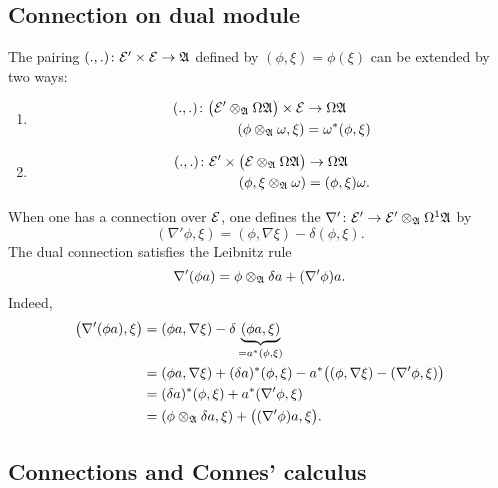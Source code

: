\subsection{Connection on dual module}

The pairing $(.,.)\colon \mathcal{E}'\times\mathcal{E}\to \mathfrak{A}$ defined by $(\phi,\xi)=\phi(\xi)$ can be extended by two ways:
\begin{enumerate}
\item 
 \begin{equation}
\begin{aligned}
 (.,.)\colon \big( \mathcal{E}'\otimes_{\mathfrak{A}}\Omega\mathfrak{A} \big)\times\mathcal{E}&\to \Omega\mathfrak{A} \\ 
   (\phi\otimes_{\mathfrak{A}}\omega,\xi)&=\omega^*(\phi,\xi)
\end{aligned}
\end{equation}
\item
\begin{equation}
\begin{aligned}
 (.,.)\colon \mathcal{E}'\times\big( \mathcal{E}\otimes_{\mathfrak{A}}\Omega\mathfrak{A} \big)&\to \Omega\mathfrak{A} \\ 
   (\phi,\xi\otimes_{\mathfrak{A}}\omega)&=(\phi,\xi)\omega. 
\end{aligned}
\end{equation}
\end{enumerate}
When one has a connection over $\mathcal{E}$, one defines the  $\nabla'\colon \mathcal{E}'\to \mathcal{E}'\otimes_{\mathfrak{A}}\Omega^1\mathfrak{A}$ by
\begin{equation}
(\nabla'\phi,\xi)=(\phi,\nabla\xi)-\delta(\phi,\xi).
\end{equation}
The dual connection satisfies the Leibnitz rule
\begin{equation}
\nabla'(\phi a)=\phi\otimes_{\mathfrak{A}}\delta a+(\nabla'\phi)a.
\end{equation}
Indeed,
\begin{align*}
\big( \nabla'(\phi a),\xi \big)&=(\phi a,\nabla\xi)-\delta\underbrace{(\phi a,\xi)}_{=a^*(\phi,\xi)}\\
				&=(\phi a,\nabla\xi)+(\delta a)^*(\phi,\xi)-a^*\big( (\phi,\nabla\xi)-(\nabla'\phi,\xi) \big)\\
				&=(\delta a)^*(\phi,\xi)+a^*(\nabla'\phi,\xi)\\
				&=(\phi\otimes_{\mathfrak{A}}\delta a,\xi)+\big( (\nabla'\phi)a,\xi \big).
\end{align*}

\subsection{Connections and Connes' calculus}

